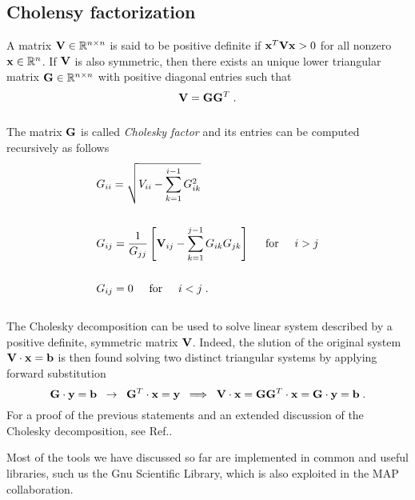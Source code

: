 \documentclass[../main.tex]{subfiles}
\begin{document}
\subsection{Cholensy factorization}
A matrix $\mathbf{V}\in \mathbb{R}^{n \times n}$ is said to be positive definite if $\mathbf{x}^T \mathbf{V} \mathbf{x} > 0$ for all nonzero $\mathbf{x} \in \mathbb{R}^{n}$. If $\mathbf{V}$ is also symmetric, then there exists an unique lower triangular matrix $\mathbf{G} \in \mathbb{R}^{n \times n}$ with positive diagonal entries such that
\\
\begin{equation*}
    \mathbf{V} = \mathbf{G} \mathbf{G}^T \;.
\end{equation*}
\\
The matrix $\mathbf{G}$ is called \textit{Cholesky factor} and its entries can be computed recursively as follows
\\
\begin{align*}
    &G_{ii} = \sqrt{V_{ii} - \sum_{k=1}^{i-1} G_{ik}^2}\\\\
    & G_{ij} = \frac{1}{G_{jj}} \left[ \mathbf{V}_{ij} - \sum_{k=1}^{j-1} G_{ik} G_{jk}\right] \hspace{5mm} \textrm{for} \hspace{5mm} i>j\\\\
    &G_{ij} = 0 \hspace{5mm} \textrm{for} \hspace{5mm} i<j \; .
\end{align*}
\\
The Cholesky decomposition can be used to solve linear system described by a positive definite, symmetric matrix $\mathbf{V}$. Indeed, the slution of the original system $\mathbf{V} \cdot \mathbf{x} = \mathbf{b}$ is then found solving two distinct triangular systems by applying forward substitution
\\
\begin{equation*}
    \mathbf{G}\cdot \mathbf{y} = \mathbf{b} \; \; \rightarrow \; \;  \mathbf{G}^{T}\cdot \mathbf{x} = \mathbf{y} \; \; \Longrightarrow \; \; \mathbf{V} \cdot\mathbf{x} = \mathbf{G} \mathbf{G}^T \cdot \mathbf{x} = \mathbf{G} \cdot \mathbf{y} = \mathbf{b}\; .
\end{equation*}
For a proof of the previous statements and an extended discussion of the Cholesky decomposition, see Ref.\cite{GoluVanl96}.\par
Most of the tools we have discussed so far are implemented in common and useful libraries, such us the Gnu Scientific Library, which is also exploited in the MAP collaboration.
\end{document}
